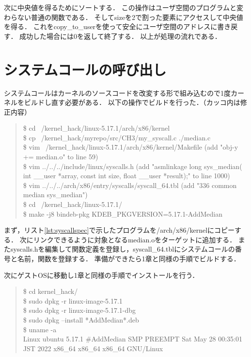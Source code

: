 次に中央値を得るためにソートする．
この操作はユーザ空間のプログラムと変わらない普通の関数である．
そしてsizeを2で割った要素にアクセスして中央値を得る．
これをcopy\_to\_userを使って安全にユーザ空間のアドレスに書き戻す．
成功した場合には0を返して終了する．
以上が処理の流れである．

\section{システムコールの呼び出し}
システムコールはカーネルのソースコードを改変する形で組み込むので1度カーネルをビルドし直す必要がある．
以下の操作でビルドを行った．（カッコ内は修正内容）
\begin{quote}
\$ cd ~/kernel\_hack/linux-5.17.1/arch/x86/kernel \\
\$ cp ~/kernel\_hack/myrepo/src/CH3/my\_syscall.c  ./median.c \\
\$ vim ~/kernel\_hack/linux-5.17.1/arch/x86/kernel/Makefile (add "obj-y           += median.o" to line 59) \\
\$ vim ../../../include/linux/syscalls.h (add "asmlinkage long sys\_median( int \_\_user *array, const int size, float \_\_user *result);" to line 1000) \\
\$ vim ../../../arch/x86/entry/syscalls/syscall\_64.tbl (add "336 common  median         sys\_median") \\
\$ cd ~/kernel\_hack/linux-5.17.1/ \\
\$ make -j8 bindeb-pkg  KDEB\_PKGVERSION=5.17.1-AddMedian
\end{quote}

まず，リスト\ref{lst:syscallspec}で示したプログラムを/arch/x86/kernelにコピーする．
次にリンクできるように対象となるmedian.oをターゲットに追加する．
またsyscalls.hを編集して関数定義を登録し，syscall\_64.tblにシステムコールの番号と名前，関数を登録する．
準備ができたら1章と同様の手順でビルドする．

次にゲストOSに移動し1章と同様の手順でインストールを行う．
\begin{quote}
\$ cd kernel\_hack/ \\
\$ sudo dpkg -r linux-image-5.17.1 \\
\$ sudo dpkg -r linux-image-5.17.1-dbg \\
\$ sudo dpkg --install *AddMedian*.deb \\
\$ uname -a \\
Linux ubuntu 5.17.1 \#AddMedian SMP PREEMPT Sat May 28 00:35:01 JST 2022 x86\_64 x86\_64 x86\_64 GNU/Linux
\end{quote}

